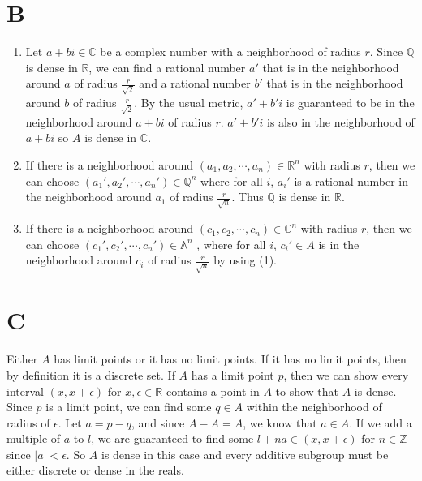 \documentclass{article}
\begin{document}
\section*{B}
\begin{enumerate}
    \item Let $a + bi \in \mathbb{C}$ be a complex number with a neighborhood of radius $r$.
    Since $\mathbb{Q}$ is dense in $\mathbb{R}$, we can find a rational number $a'$ 
    that is in the neighborhood around $a$ of radius $\frac{r}{\sqrt{2}}$
    and a rational number $b'$ that is in the neighborhood around $b$ of radius $\frac{r}{\sqrt{2}}$.
    By the usual metric, $a' + b'i$ is guaranteed to be in the neighborhood around $a+bi$ of radius $r$.
    $a'+b'i$ is also in the neighborhood of $a+bi$ so $A$ is dense in $\mathbb{C}$.
    \item If there is a neighborhood around $(a_1, a_2,\cdots, a_n) \in \mathbb{R}^n$ with radius $r$,
    then we can choose $(a_1', a_2', \cdots, a_n') \in \mathbb{Q}^n$ 
    where for all $i$, $a_i'$ is a rational number in the neighborhood around $a_1$ of radius $\frac{r}{\sqrt{n}}$.
    Thus $\mathbb{Q}$ is dense in $\mathbb{R}$.
    \item If there is a neighborhood around $(c_1, c_2,\cdots, c_n) \in \mathbb{C}^n$ with radius $r$,
    then we can choose $(c_1', c_2', \cdots, c_n') \in \mathbb{A}^n$ ,
    where for all $i$, $c_i'\in A$ is in the neighborhood around 
    $c_i$ of radius $\frac{r}{\sqrt{n}}$ by using (1).
\end{enumerate}
\newpage 

\section*{C}
Either $A$ has limit points or it has no limit points.
If it has no limit points, then by definition it is a discrete set.
If $A$ has a limit point $p$, then we can show every interval 
$(x,x + \epsilon)$ for $x, \epsilon \in \mathbb{R}$ 
contains a point in $A$ to show that $A$ is dense. \\

Since $p$ is a limit point, we can find some $q \in A$ within the 
neighborhood of radius of $\epsilon$.
Let $a = p-q$, and since $A-A=A$, we know that $a \in A$.
If we add a multiple of $a$ to $l$, we are guaranteed
to find some $l + na \in (x, x + \epsilon)$ for $n \in \mathbb{Z}$ since $|a| < \epsilon$.
So $A$ is dense in this case and every additive subgroup must be either discrete or dense in the reals.
\newpage 
\end{document}
